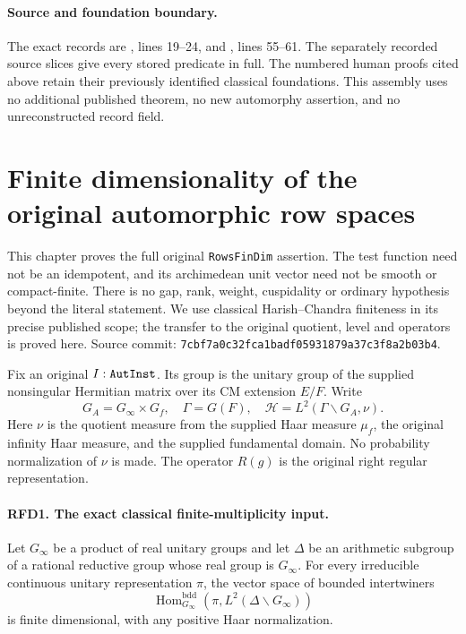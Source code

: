 \documentclass[11pt,a4paper]{article}
\numberwithin{equation}{section}
\theoremstyle{remark}\newtheorem{remark}[theorem]{Remark}
\begin{document}
\paragraph{Source and foundation boundary.}
The exact records are ,
lines 19--24, and
,
lines 55--61.  The separately recorded source slices give every
stored predicate in full.  The numbered human proofs cited above
retain their previously identified classical foundations.  This
assembly uses no additional published theorem, no new automorphy
assertion, and no unreconstructed record field.


\section{Finite dimensionality of the original automorphic row spaces}
\label{sec:row-finiteness-v47}

This chapter proves the full original \texttt{Rows\allowbreak Fin\allowbreak Dim} assertion.
The test function need not be an idempotent, and its archimedean unit
vector need not be smooth or compact-finite.  There is no gap, rank,
weight, cuspidality or ordinary hypothesis beyond the literal statement.
We use classical Harish--Chandra finiteness in its precise published
scope; the transfer to the original quotient, level and operators is
proved here.  Source commit:
\texttt{7cbf7a0c32fca1badf05931879a37c3f8a2b03b4}.

Fix an original \(I:\texttt{Aut\allowbreak Inst}\).  Its group is the unitary
group of the supplied nonsingular Hermitian matrix over its CM
extension \(E/F\).  Write
\[
 G_A=G_\infty\times G_f,
 \quad \Gamma=G(F),
 \quad \mathcal H=L^2(\Gamma\backslash G_A,\nu).
 \tag{RFD.1}
\]
Here \(\nu\) is the quotient measure from the supplied Haar measure
\(\mu_f\), the original infinity Haar measure, and the supplied
fundamental domain.  No probability normalization of \(\nu\) is made.
The operator \(R(g)\) is the original right regular representation.

\paragraph{RFD1. The exact classical finite-multiplicity input.}
\label{claim:RFD1}
Let \(G_\infty\) be a product of real unitary groups and let
\(\Delta\) be an arithmetic subgroup of a rational reductive group
whose real group is \(G_\infty\).  For every irreducible continuous
unitary representation \(\pi\), the vector space of bounded
intertwiners
\[
 \operatorname{Hom}^{\mathrm{bdd}}_{G_\infty}
       (\pi,L^2(\Delta\backslash G_\infty))
 \tag{RFD.2}
\]
is finite dimensional, with any positive Haar normalization.
\end{document}

